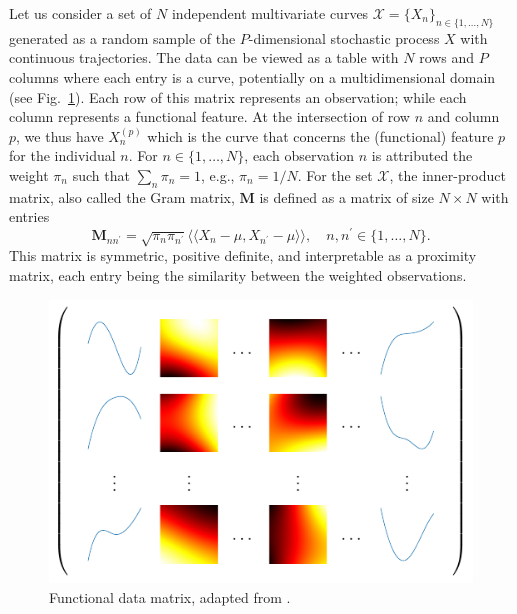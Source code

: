 \documentclass[times,sort&compress,3p]{elsarticle}
\theoremstyle{plain}%
\theoremstyle{definition}
\newcommand{\XX}{\mathcal{X}} %
\newcommand{\inH}[2]{\langle\!\langle#1, #2\rangle\!\rangle}
\newcommand{\Xnp}{X_n^{(p)}} %
\begin{document}
Let us consider a set of $N$ independent multivariate curves $\XX = \{X_n\}_{n \in \{1, \dots, N\}}$ generated as a random sample of the $P$-dimensional stochastic process $X$ with continuous trajectories. The data can be viewed as a table with $N$ rows and $P$ columns where each entry is a curve, potentially on a multidimensional domain (see Fig.~\ref{fig:data_matrix}). Each row of this matrix represents an observation; while each column represents a functional feature. At the intersection of row $n$ and column~$p$, we thus have $\Xnp$ which is the curve that concerns the (functional) feature $p$ for the individual $n$. For $n \in \{1, \dots, N\}$, each observation $n$ is attributed the weight $\pi_n$ such that $\sum_n \pi_n = 1$, e.g., $\pi_n = 1/N$. For the set $\mathcal{X}$, the inner-product matrix, also called the Gram matrix, $\mathbf{M}$ is defined as a matrix of size $N \times N$ with entries
\begin{equation}\label{eq:gram_mat}
    \mathbf{M}_{nn^\prime} = \sqrt{\pi_n \pi_{n^{\prime}}}\inH{X_n - \mu}{X_{n^\prime} - \mu}, \quad n, n^\prime \in \{1, \dots, N\}.
\end{equation}
This matrix is symmetric, positive definite, and interpretable as a proximity matrix, each entry being the similarity between the weighted observations.

\begin{figure}
    \centering
    \includegraphics[scale=0.9]{data_matrix.pdf}
    \caption{Functional data matrix, adapted from \cite{berrenderoPrincipalComponentsMultivariate2011}.}
    \label{fig:data_matrix}
\end{figure}
\end{document}
